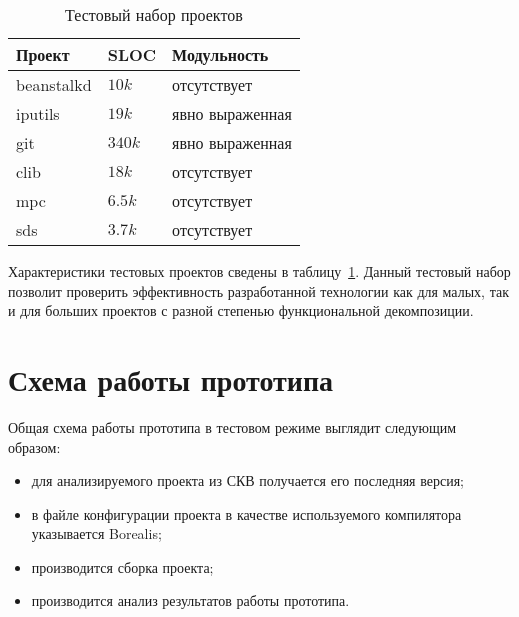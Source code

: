\begin{table}
\caption{Тестовый набор проектов}
\begin{center}
\begin{tabular}{|l|l|l|}
\hline 
\textbf{Проект} & \textbf{SLOC} & \textbf{Модульность}  \\ 
\hline 
beanstalkd & $10k$ & отсутствует \\ 
\hline 
iputils & $19k$ & явно выраженная \\ 
\hline 
git & $340k$ & явно выраженная \\ 
\hline 
clib & $18k$ & отсутствует \\ 
\hline 
mpc & $6.5k$ & отсутствует \\ 
\hline 
sds & $3.7k$ & отсутствует \\ 
\hline 
\end{tabular} 
\end{center}
\label{table:testProjects}
\end{table}

Характеристики тестовых проектов сведены в таблицу~\ref{table:testProjects}. 
Данный тестовый набор позволит проверить эффективность разработан­ной 
технологии как для малых, так и для больших проектов с разной степенью 
функциональной декомпозиции.

\section{Схема работы прототипа}
Общая схема работы прототипа в тестовом режиме выглядит следующим образом:
\begin{itemize}
\item для анализируемого проекта из СКВ получается его последняя версия;
\item в файле конфигурации проекта в качестве используемого компилятора 
указывается Borealis;
\item производится сборка проекта;
\item производится анализ результатов работы прототипа.
\end{itemize}

